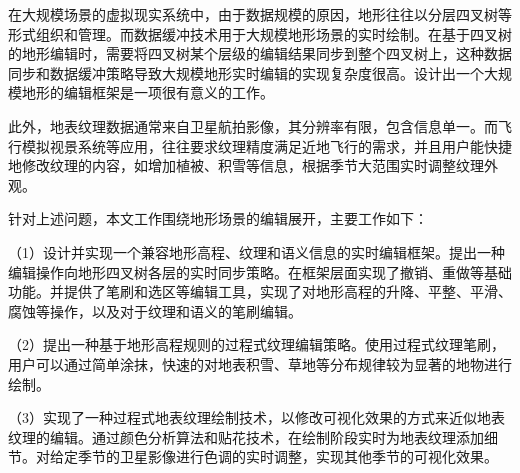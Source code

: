 
\begin{cabstract}
	在大规模场景的虚拟现实系统中，由于数据规模的原因，地形往往以分层四叉树等形式组织和管理。而数据缓冲技术用于大规模地形场景的实时绘制。在基于四叉树的地形编辑时，需要将四叉树某个层级的编辑结果同步到整个四叉树上，这种数据同步和数据缓冲策略导致大规模地形实时编辑的实现复杂度很高。设计出一个大规模地形的编辑框架是一项很有意义的工作。\par
	此外，地表纹理数据通常来自卫星航拍影像，其分辨率有限，包含信息单一。而飞行模拟视景系统等应用，往往要求纹理精度满足近地飞行的需求，并且用户能快捷地修改纹理的内容，如增加植被、积雪等信息，根据季节大范围实时调整纹理外观。\par
	针对上述问题，本文工作围绕地形场景的编辑展开，主要工作如下：\par
	（1）设计并实现一个兼容地形高程、纹理和语义信息的实时编辑框架。提出一种编辑操作向地形四叉树各层的实时同步策略。在框架层面实现了撤销、重做等基础功能。并提供了笔刷和选区等编辑工具，实现了对地形高程的升降、平整、平滑、腐蚀等操作，以及对于纹理和语义的笔刷编辑。\par
	（2）提出一种基于地形高程规则的过程式纹理编辑策略。使用过程式纹理笔刷，用户可以通过简单涂抹，快速的对地表积雪、草地等分布规律较为显著的地物进行绘制。\par
	（3）实现了一种过程式地表纹理绘制技术，以修改可视化效果的方式来近似地表纹理的编辑。通过颜色分析算法和贴花技术，在绘制阶段实时为地表纹理添加细节。对给定季节的卫星影像进行色调的实时调整，实现其他季节的可视化效果。\par

\end{cabstract}
\cleardoublepage
